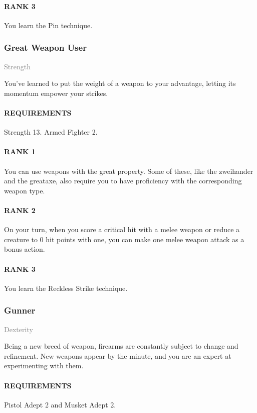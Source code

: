 \paragraph{RANK 3} You learn the Pin technique.

\subsubsection{Great Weapon User} \label{feat::greatweaponuser}
\small{\textcolor{gray}{Strength}}

\normalsize
You've learned to put the weight of a weapon to your advantage, letting its momentum empower your strikes.
\paragraph{REQUIREMENTS} Strength 13. Armed Fighter 2.
\paragraph{RANK 1} You can use weapons with the great property.
Some of these, like the zweihander and the greataxe, also require you to have proficiency with the corresponding weapon type.
\paragraph{RANK 2} On your turn, when you score a critical hit with a melee weapon or reduce a creature to 0 hit points with one, you can make one melee weapon attack as a bonus action.
\paragraph{RANK 3} You learn the Reckless Strike technique.

\subsubsection{Gunner} \label{feat::gunner}
\small{\textcolor{gray}{Dexterity}}

\normalsize
Being a new breed of weapon, firearms are constantly subject to change and refinement.
New weapons appear by the minute, and you are an expert at experimenting with them.
\paragraph{REQUIREMENTS} Pistol Adept 2 and Musket Adept 2.
